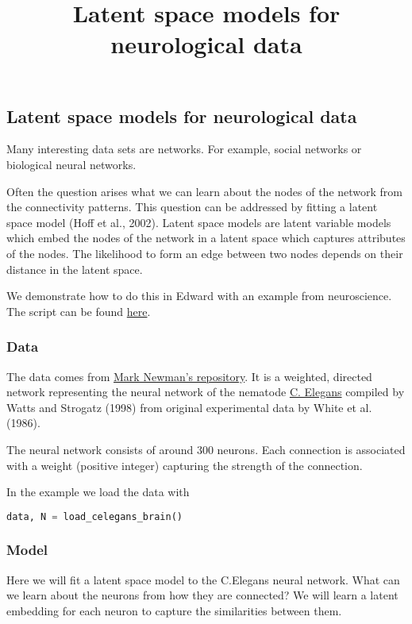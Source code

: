 \title{Latent space models for neurological data}

\subsection{Latent space models for neurological data}

Many interesting data sets are networks. For example, social networks or biological neural networks.

Often the question arises what we can learn about the nodes of the
network from the connectivity patterns. This question can be addressed
by fitting a latent space model (Hoff et al., 2002).
Latent space models are latent variable models which embed the nodes
of the network in a latent space which captures attributes of the
nodes. The likelihood to form an edge between two nodes depends on
their distance in the latent space.

We demonstrate how to do this in Edward with an example from neuroscience.
The script can be found
\href{https://github.com/blei-lab/edward/blob/master/examples/latent_space_model.py}{here}.

\subsubsection{Data}

The data comes from \href{http://www-personal.umich.edu/~mejn/netdata/}{Mark Newman's repository}.
It is a weighted, directed network representing the neural network of
the nematode
\href{https://en.wikipedia.org/wiki/Caenorhabditis_elegans}{C.  Elegans}
compiled by Watts and Strogatz (1998) from original experimental data
by White et al. (1986).

The neural network consists of around $300$ neurons. Each connection
is associated with a weight (positive integer) capturing the strength
of the connection.

In the example we load the data with
\begin{lstlisting}[language=Python]
data, N = load_celegans_brain()
\end{lstlisting}

\subsubsection{Model}

Here we will fit a latent space model to the C.Elegans neural network. What can we learn about the neurons from how they are connected? We will learn a latent embedding for each neuron to capture the similarities between them.


